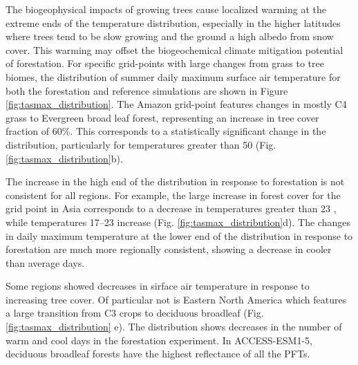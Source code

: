 \documentclass[]{article}
\begin{document}
The biogeophysical impacts of growing trees cause localized warming at the extreme ends of the temperature distribution, especially in the higher latitudes where trees tend to be slow growing and the ground a high albedo from snow cover.
This warming may offset the biogeochemical climate mitigation potential of forestation.
For specific grid-points with large changes from grass to tree biomes, the distribution of summer daily maximum surface air temperature for both the forestation and reference simulations are shown in Figure \ref{fig:tasmax_distribution}.
The Amazon grid-point features changes in mostly C4 grass to Evergreen broad leaf forest, representing an increase in tree cover fraction of 60\%.
This corresponds to a statistically significant change in the distribution, particularly for temperatures greater than 50 \textcelsius{} (Fig. \ref{fig:tasmax_distribution}b).

The increase in the high end of the distribution in response to forestation is not consistent for all regions.
For example, the large increase in forest cover for the grid point in Asia corresponds to a decrease in temperatures greater than 23 \textcelsius{}, while temperatures 17--23 \textcelsius{} increase (Fig. \ref{fig:tasmax_distribution}d).
The changes in daily maximum temperature at the lower end of the distribution in response to forestation are much more regionally consistent, showing a decrease in cooler than average days.

Some regions showed decreases in sirface air temperature in response to increasing tree cover.
Of particular not is Eastern North America which features a large transition from C3 crops to deciduous broadleaf (Fig. \ref{fig:tasmax_distribution} e).
The distribution shows decreases in the number of warm and cool days in the forestation experiment.
In ACCESS-ESM1-5, deciduous broadleaf forests have the highest reflectance of all the PFTs.
\end{document}
